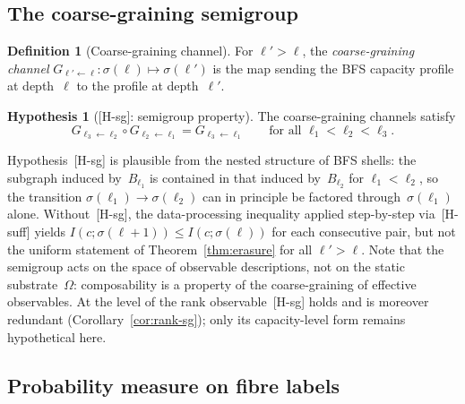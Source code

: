 \documentclass[11pt,a4paper]{article}
\theoremstyle{plain}
\theoremstyle{definition}
\newtheorem{definition}[theorem]{Definition}
\newtheorem{hypothesis}[theorem]{Hypothesis}
\theoremstyle{remark}
\newcommand{\Omegaspace}{\Omega}
\begin{document}
  \subsection{The coarse-graining semigroup}
    \label{sec:semigroup}

    \begin{definition}[Coarse-graining channel]
      \label{def:channel}
      For $\ell' > \ell$, the \emph{coarse-graining channel}
      $G_{\ell' \leftarrow \ell} : \sigma(\ell) \mapsto \sigma(\ell')$
      is the map sending the BFS capacity profile at depth~$\ell$ to the profile
      at depth~$\ell'$.
    \end{definition}

    \begin{hypothesis}[\textup{[H-sg]}: semigroup property]
      \label{hyp:sg}
      The coarse-graining channels satisfy
      \begin{equation}
        \label{eq:sg}
        G_{\ell_3 \leftarrow \ell_2} \circ G_{\ell_2 \leftarrow \ell_1}
        = G_{\ell_3 \leftarrow \ell_1}
        \qquad \text{for all } \ell_1 < \ell_2 < \ell_3.
      \end{equation}
    \end{hypothesis}

    Hypothesis~\textup{[H-sg]} is plausible from the nested structure of BFS shells:
    the subgraph induced by~$B_{\ell_1}$ is contained in that induced by~$B_{\ell_2}$
    for $\ell_1 < \ell_2$,
    so the transition $\sigma(\ell_1) \to \sigma(\ell_2)$ can in principle be factored
    through~$\sigma(\ell_1)$ alone.
    Without~\textup{[H-sg]}, the data-processing inequality applied step-by-step
    via~\textup{[H-suff]} yields $I(c;\sigma(\ell+1)) \leq I(c;\sigma(\ell))$
    for each consecutive pair,
    but not the uniform statement of Theorem~\ref{thm:erasure} for all $\ell' > \ell$.
    Note that the semigroup acts on the space of observable descriptions,
    not on the static substrate~$\Omegaspace$:
    composability is a property of the coarse-graining of effective observables.
    At the level of the rank observable~\textup{[H-sg]} holds and is moreover redundant
    (Corollary~\ref{cor:rank-sg}); only its capacity-level form remains hypothetical here.

  \subsection{Probability measure on fibre labels}
    \label{sec:measure}
\end{document}
